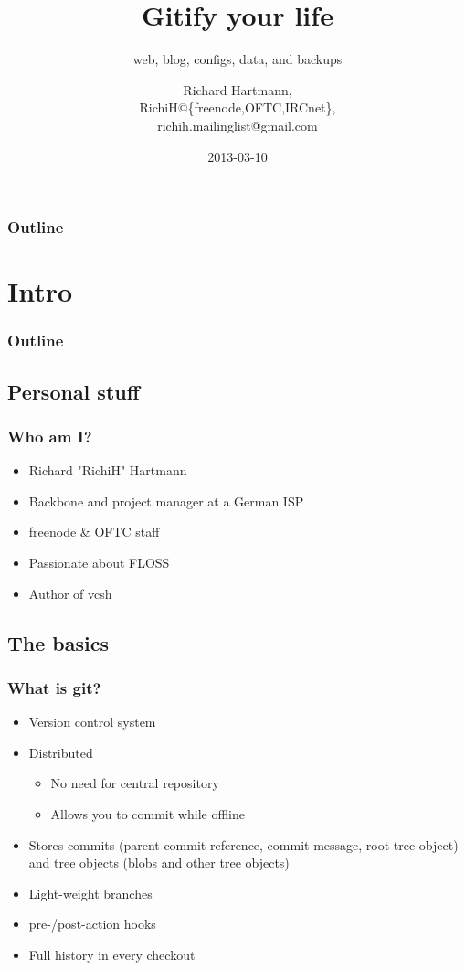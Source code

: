 \documentclass[t]{beamer}
\title{Gitify your life}
\subtitle{web, blog, configs, data, and backups}
\author{Richard Hartmann,\\
RichiH@\{freenode,OFTC,IRCnet\},\\
richih.mailinglist@gmail.com}
\date{2013-03-10}
\begin{document}
\setcounter{tocdepth}{1}

\begin{frame}
	\titlepage
\end{frame}

\begin{frame}
	\frametitle{Outline}
	\tableofcontents
\end{frame}


\section{Intro}

\begin{frame}
	\frametitle{Outline}
	\tableofcontents[currentsection]
\end{frame}

\subsection{Personal stuff}

\begin{frame}
	\frametitle{Who am I?}
	\begin{itemize}
		\item Richard "RichiH" Hartmann
		\item Backbone and project manager at a German ISP
		\item freenode \& OFTC staff
		\item Passionate about FLOSS
		\item Author of vcsh
	\end{itemize}
\end{frame}

\subsection{The basics}

\begin{frame}
	\frametitle{What is git?}
	\begin{itemize}
		\item Version control system
		\item Distributed
		\begin{itemize}
			\item No need for central repository
			\item Allows you to commit while offline
		\end{itemize}
		\item Stores commits (parent commit reference, commit message, root tree object) and tree objects (blobs and other tree objects)
		\item Light-weight branches
		\item pre-/post-action hooks
		\item Full history in every checkout
	\end{itemize}
\end{frame}
\end{document}
